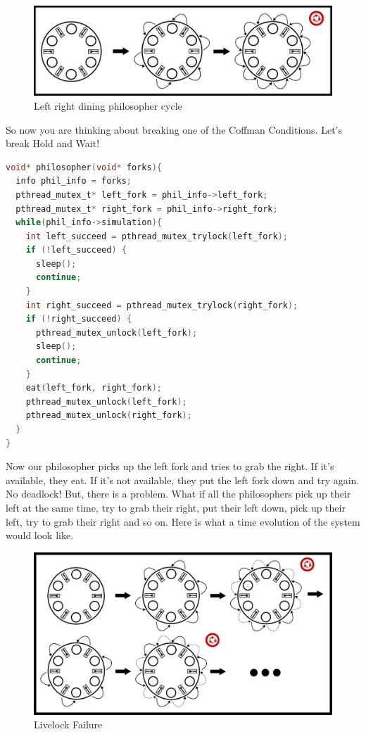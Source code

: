 \begin{figure}[H]
	\centering
	\includegraphics[width=.9\textwidth]{deadlock/drawings/dining_naive.eps}
	\caption{Left right dining philosopher cycle}
\end{figure}


So now you are thinking about breaking one of the Coffman Conditions.
Let's break Hold and Wait!

\begin{lstlisting}[language=C]
void* philosopher(void* forks){
  info phil_info = forks;
  pthread_mutex_t* left_fork = phil_info->left_fork;
  pthread_mutex_t* right_fork = phil_info->right_fork;
  while(phil_info->simulation){
    int left_succeed = pthread_mutex_trylock(left_fork);
    if (!left_succeed) {
      sleep();
      continue;
    }
    int right_succeed = pthread_mutex_trylock(right_fork);
    if (!right_succeed) {
      pthread_mutex_unlock(left_fork);
      sleep();
      continue;
    }
    eat(left_fork, right_fork);
    pthread_mutex_unlock(left_fork);
    pthread_mutex_unlock(right_fork);
  }
}
\end{lstlisting}

Now our philosopher picks up the left fork and tries to grab the right.
If it's available, they eat.
If it's not available, they put the left fork down and try again.
No deadlock! But, there is a problem.
What if all the philosophers pick up their left at the same time, try to grab their right, put their left down, pick up their left, try to grab their right and so on.
Here is what a time evolution of the system would look like.

\begin{figure}[H]
	\centering
	\includegraphics[width=.9\textwidth]{deadlock/drawings/dining_livelock.eps}
	\caption{Livelock Failure}
\end{figure}

